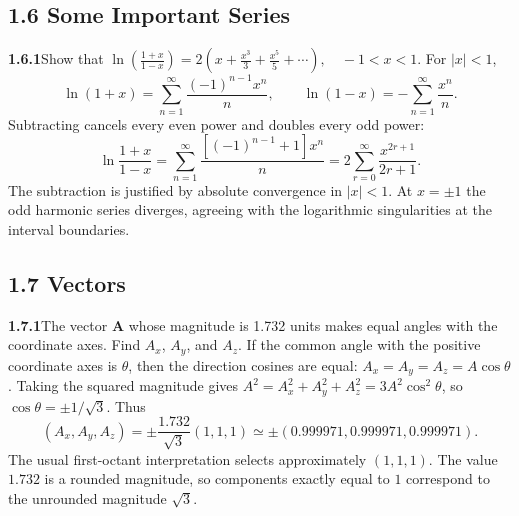 \subsection*{1.6 Some Important Series}

\par\bigskip
\noindent\textbf{1.6.1}\quad Show that
$\displaystyle\ln\left(\frac{1+x}{1-x}\right)
=2\left(x+\frac{x^{3}}{3}+\frac{x^{5}}{5}+\cdots\right),\quad -1<x<1$.
\solution
For $|x|<1$,
\[
 \ln(1+x)=\sum_{n=1}^\infty\frac{(-1)^{n-1}x^n}{n},\qquad
 \ln(1-x)=-\sum_{n=1}^\infty\frac{x^n}{n}.
\]
Subtracting cancels every even power and doubles every odd power:
\[
 \ln\frac{1+x}{1-x}
 =\sum_{n=1}^\infty\frac{[(-1)^{n-1}+1]x^n}{n}
 =2\sum_{r=0}^\infty\frac{x^{2r+1}}{2r+1}.
\]
The subtraction is justified by absolute convergence in $|x|<1$.
At $x=\pm1$ the odd harmonic series diverges, agreeing with the
logarithmic singularities at the interval boundaries.


\subsection*{1.7 Vectors}

\par\bigskip
\noindent\textbf{1.7.1}\quad The vector $\mathbf{A}$ whose magnitude is 1.732
units makes equal angles with the  coordinate axes. Find $A_{x}$, $A_{y}$, and
$A_{z}$.
\solution
If the common angle with the positive coordinate axes is $\theta$, then
the direction cosines are equal: $A_x=A_y=A_z=A\cos\theta$. Taking the
squared magnitude gives
$A^2=A_x^2+A_y^2+A_z^2=3A^2\cos^2\theta$, so $\cos\theta=\pm1/\sqrt3$.
Thus
\[
 (A_x,A_y,A_z)=\pm\frac{1.732}{\sqrt3}(1,1,1)
             \simeq\pm(0.999971,0.999971,0.999971).
\]
The usual first-octant interpretation selects approximately $(1,1,1)$.
The value $1.732$ is a rounded magnitude, so components exactly equal
to $1$ correspond to the unrounded magnitude $\sqrt3$.


